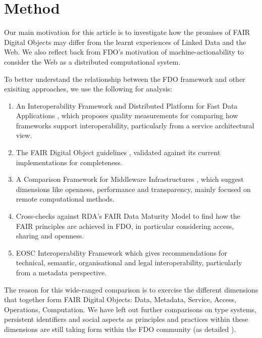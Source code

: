 \documentclass[fleqn,10pt,NOlineno]{wlpeerjlua}
\providecommand{\tightlist}{%
  \setlength{\itemsep}{0pt}\setlength{\parskip}{0pt}}
\begin{document}
\section*{Method}

Our main motivation for this article is to investigate how the promises of FAIR Digital Objects may differ from the learnt experiences of Linked Data and the Web. We also reflect back from FDO's motivation of machine-actionability to consider the Web as a distributed computational system.

To better understand the relationship between the FDO framework and other exisiting approaches, we use the following for analysis:

\begin{enumerate}
\tightlist
\item
  An Interoperability Framework and Distributed Platform for Fast Data Applications \autocite{delgadoInteroperabilityFrameworkDistributed2016a}, which proposes quality measurements for comparing how frameworks support interoperability, particularly from a service architectural view.
\item
  The FAIR Digital Object guidelines \autocite{boninoFAIRDigitalObject}, validated against its current implementations for completeness.
\item
  A Comparison Framework for Middleware Infrastructures \autocite{zarrasComparisonFrameworkMiddleware2004a}, which suggest dimensions like openness, performance and transparency, mainly focused on remote computational methods.
\item
  Cross-checks against RDA's FAIR Data Maturity Model \autocite{bahimFAIRDataMaturity2020a} to find how the FAIR principles are achieved in FDO, in particular considering access, sharing and openness.
\item
  EOSC Interoperability Framework \autocite{corchoEOSCInteroperabilityFramework2021b} which gives recommendations for technical, semantic, organisational and legal interoperability, particularly from a metadata perspective.
\end{enumerate}

The reason for this wide-ranged comparison is to exercise the different dimensions that together form FAIR Digital Objects: Data, Metadata, Service, Access, Operations, Computation.
We have left out further comparisons on type systems, persistent identifiers and social aspects as principles and practices within these dimensions are still taking form within the FDO community (as detailed ).
\end{document}
